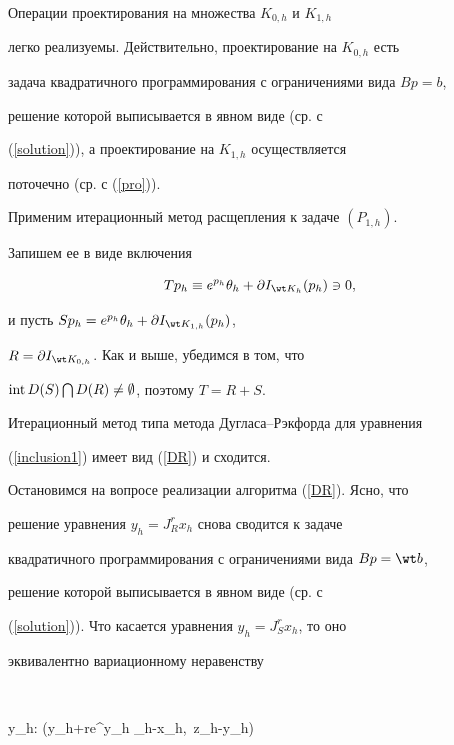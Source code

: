 Операции проектирования на множества $K_{0,h}$ и $K_{1,h}$


легко реализуемы. Действительно, проектирование на $K_{0,h}$ есть


задача квадратичного программирования с ограничениями вида $Bp=b$,


решение которой выписывается в явном виде (ср. с


(\ref{solution})), а проектирование на $K_{1,h}$ осуществляется


поточечно (ср. с (\ref{pro})).





Применим итерационный метод расщепления к задаче $(P_{1,h})$.


Запишем ее в виде включения


\begin{equation}\label{inclusion1}


Tp_h\equiv e^{p_h} \theta_h + \partial I_{\wt K_h}(p_h)\ni 0,


\end{equation}


и пусть $Sp_h=e^{p_h} \theta_h+\partial I_{\wt K_{1,h}}(p_h)$,


$R=\partial I_{\wt K_{0,h}}$. Как и выше, убедимся в том, что


$\operatorname{int} D(S)\bigcap D(R)\neq \emptyset$, поэтому $T=R+S$.





Итерационный метод типа метода Дугласа--Рэкфорда для уравнения


(\ref{inclusion1}) имеет вид (\ref{DR}) и сходится.





Остановимся на вопросе реализации алгоритма (\ref{DR}). Ясно, что


решение уравнения $y_h=J^r_{R}x_h$ снова сводится к задаче


квадратичного программирования с ограничениями вида $Bp=\wt b$,


решение которой выписывается в явном виде (ср. с


(\ref{solution})). Что касается уравнения $y_h=J^r_{S}x_h$, то оно


эквивалентно вариационному неравенству


$$




y_h: (y_h+re^{y_h} \theta_h-x_h,\, z_h-y_h)


